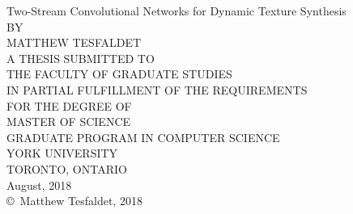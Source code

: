 \begin{titlepage}
	\thispagestyle{empty}
	\setcounter{page}{0}
	\centering
	{\LARGE Two-Stream Convolutional Networks for Dynamic Texture Synthesis\\}
	\vspace{4cm}
	BY\\
	\vspace{0.5cm}
	MATTHEW TESFALDET\\
	\vspace{2cm}
	A THESIS SUBMITTED TO\\
	THE FACULTY OF GRADUATE STUDIES\\
	IN PARTIAL FULFILLMENT OF THE REQUIREMENTS\\
	FOR THE DEGREE OF\\
	MASTER OF SCIENCE\\
	\vspace{1cm}
	GRADUATE PROGRAM IN COMPUTER SCIENCE\\
	YORK UNIVERSITY\\
	TORONTO, ONTARIO\\
	\vspace{1cm}
	August, 2018\\
	\vspace{1cm}
	\copyright \, Matthew Tesfaldet, 2018
\end{titlepage}